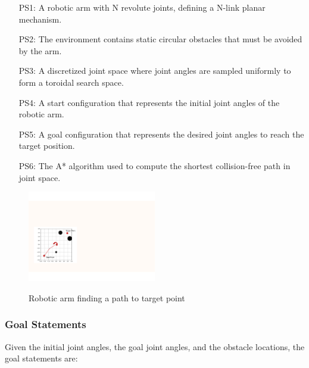 \documentclass[12pt]{article}
\begin{document}
\begin{itemize}

  \item[PS1:] A robotic arm with N revolute joints, defining a N-link planar mechanism.

  \item[PS2:] The environment contains static circular obstacles that must be avoided by the arm.

  \item[PS3:] A discretized joint space where joint angles are sampled uniformly to form a toroidal search space.

  \item[PS4:] A start configuration that represents the initial joint angles of the robotic arm.

  \item[PS5:] A goal configuration that represents the desired joint angles to reach the target position.

  \item[PS6:] The A* algorithm used to compute the shortest collision-free path in joint space.

  \end{itemize}


\begin{figure}[h!]
\begin{center}
{
 \includegraphics[width=0.5\textwidth]{Physical System Description}
}
\caption{Robotic arm finding a path to target point}
\label{Fig:Robotic arm} 
\end{center}
\end{figure}

\subsubsection{Goal Statements} \label{sec_Goal}    

\noindent Given the initial joint angles, the goal joint angles, and the obstacle locations, the goal statements are:
\end{document}
